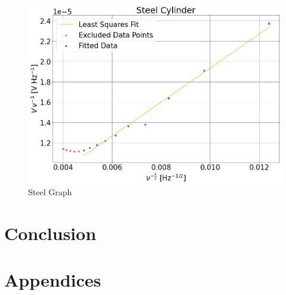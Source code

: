 \documentclass[a4paper,12pt,twocolumn]{article}
\begin{document}
	\begin{figure}
		\centering
		\includegraphics[scale=0.4]{steelGraph.png}
		\captionsetup{font=scriptsize}
		\caption{Steel Graph}
		\label{fig:steelGraph}
	\end{figure}
	

\section{Conclusion}
	

\newpage
\begin{thebibliography}{}
	
	
\end{thebibliography}

	

\newpage

\section*{Appendices}
	
	
\end{document}
